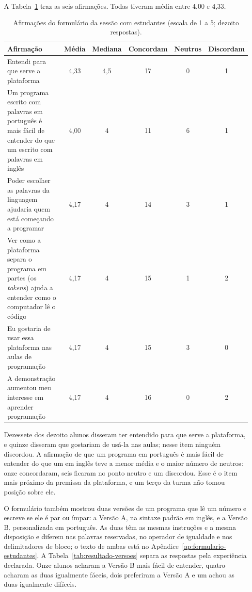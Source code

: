 A Tabela~\ref{tab:resultado-estudantes} traz as seis afirmações. Todas tiveram média entre 4,00 e 4,33.

\begin{table}[htbp]
\centering
\caption{Afirmações do formulário da sessão com estudantes (escala de 1 a 5; dezoito respostas).}
\label{tab:resultado-estudantes}
\footnotesize
\renewcommand{\arraystretch}{1.2}
\begin{tabular}{|p{6.3cm}|c|c|c|c|c|}
\hline
\textbf{Afirmação} & \textbf{Média} & \textbf{Mediana} & \textbf{Concordam} & \textbf{Neutros} & \textbf{Discordam} \\\hline
Entendi para que serve a plataforma & 4,33 & 4,5 & 17 & 0 & 1 \\\hline
Um programa escrito com palavras em português é mais fácil de entender do que um escrito com palavras em inglês & 4,00 & 4 & 11 & 6 & 1 \\\hline
Poder escolher as palavras da linguagem ajudaria quem está começando a programar & 4,17 & 4 & 14 & 3 & 1 \\\hline
Ver como a plataforma separa o programa em partes (os \textit{tokens}) ajuda a entender como o computador lê o código & 4,17 & 4 & 15 & 1 & 2 \\\hline
Eu gostaria de usar essa plataforma nas aulas de programação & 4,17 & 4 & 15 & 3 & 0 \\\hline
A demonstração aumentou meu interesse em aprender programação & 4,17 & 4 & 16 & 0 & 2 \\\hline
\end{tabular}
\end{table}

Dezessete dos dezoito alunos disseram ter entendido para que serve a plataforma, e quinze disseram que gostariam de usá-la nas aulas; nesse item ninguém discordou. A afirmação de que um programa em português é mais fácil de entender do que um em inglês teve a menor média e o maior número de neutros: onze concordaram, seis ficaram no ponto neutro e um discordou. Esse é o item mais próximo da premissa da plataforma, e um terço da turma não tomou posição sobre ele.

O formulário também mostrou duas versões de um programa que lê um número e escreve se ele é par ou ímpar: a Versão A, na sintaxe padrão em inglês, e a Versão B, personalizada em português. As duas têm as mesmas instruções e a mesma disposição e diferem nas palavras reservadas, no operador de igualdade e nos delimitadores de bloco; o texto de ambas está no Apêndice~\ref{ap:formulario-estudantes}. A Tabela~\ref{tab:resultado-versoes} separa as respostas pela experiência declarada. Onze alunos acharam a Versão B mais fácil de entender, quatro acharam as duas igualmente fáceis, dois preferiram a Versão A e um achou as duas igualmente difíceis.


